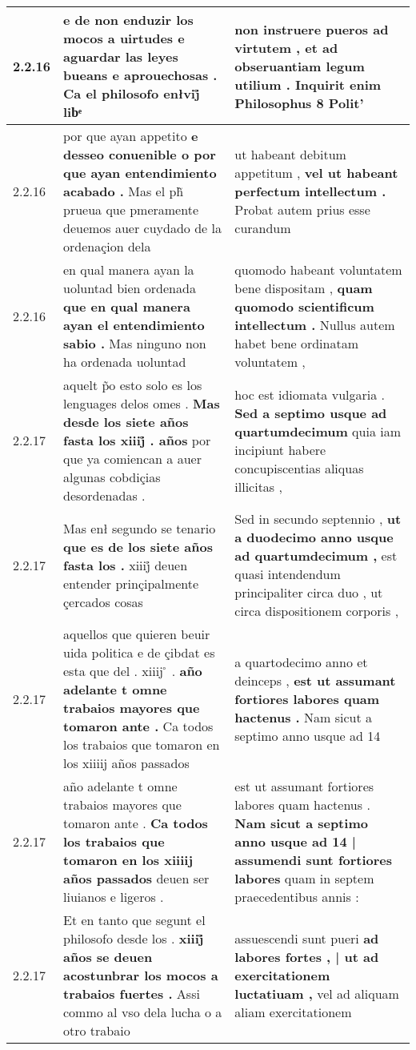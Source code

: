 \begin{tabular}{|p{1cm}|p{6.5cm}|p{6.5cm}|}
2.2.16 & e de non enduzir los mocos a uirtudes \textbf{ e aguardar las leyes bueans e aprouechosas . } Ca el philosofo enłvij̊ libͤ & non instruere pueros ad virtutem , \textbf{ et ad obseruantiam legum utilium . } Inquirit enim Philosophus 8 Polit’ \\\hline
2.2.16 & por que ayan appetito \textbf{ e desseo conuenible o por que ayan entendimiento acabado . } Mas el ph̃ prueua que pmeramente deuemos auer cuydado de la ordenaçion dela & ut habeant debitum appetitum , \textbf{ vel ut habeant perfectum intellectum . } Probat autem prius esse curandum \\\hline
2.2.16 & en qual manera ayan la uoluntad bien ordenada \textbf{ que en qual manera ayan el entendimiento sabio . } Mas ninguno non ha ordenada uoluntad & quomodo habeant voluntatem bene dispositam , \textbf{ quam quomodo scientificum intellectum . } Nullus autem habet bene ordinatam voluntatem , \\\hline
2.2.17 & aquelt p̃o esto solo es los lenguages delos omes . \textbf{ Mas desde los siete años fasta los xiiij̊ . años } por que ya comiencan a auer algunas cobdiçias desordenadas . & hoc est idiomata vulgaria . \textbf{ Sed a septimo usque ad quartumdecimum } quia iam incipiunt habere concupiscentias aliquas illicitas , \\\hline
2.2.17 & Mas enł segundo se tenario \textbf{ que es de los siete años fasta los . } xiiij̊ deuen entender prinçipalmente çercados cosas & Sed in secundo septennio , \textbf{ ut a duodecimo anno usque ad quartumdecimum , } est quasi intendendum principaliter circa duo , ut circa dispositionem corporis , \\\hline
2.2.17 & aquellos que quieren beuir uida politica e de çibdat es esta que del . xiiij ̊ . \textbf{ año adelante t omne trabaios mayores que tomaron ante . } Ca todos los trabaios que tomaron en los xiiiij años passados & a quartodecimo anno et deinceps , \textbf{ est ut assumant fortiores labores quam hactenus . } Nam sicut a septimo anno usque ad 14 \\\hline
2.2.17 & año adelante t omne trabaios mayores que tomaron ante . \textbf{ Ca todos los trabaios que tomaron en los xiiiij años passados } deuen ser liuianos e ligeros . & est ut assumant fortiores labores quam hactenus . \textbf{ Nam sicut a septimo anno usque ad 14 | assumendi sunt fortiores labores } quam in septem praecedentibus annis : \\\hline
2.2.17 & Et en tanto que segunt el philosofo desde los . \textbf{ xiiij̊ años se deuen acostunbrar los mocos a trabaios fuertes . } Assi commo al vso dela lucha o a otro trabaio & assuescendi sunt pueri \textbf{ ad labores fortes , | ut ad exercitationem luctatiuam , } vel ad aliquam aliam exercitationem \\\hline

\end{tabular}
